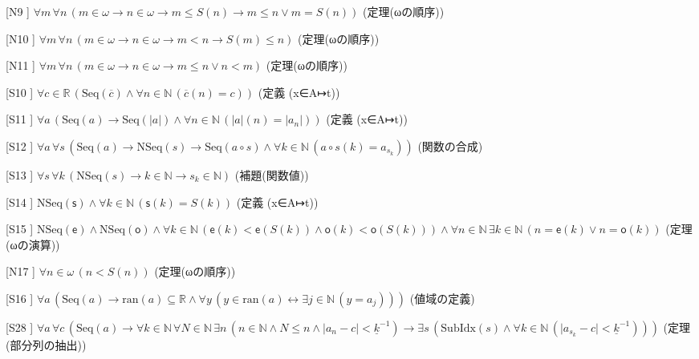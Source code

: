 \begin{registrylist}
\item[[N9]] $\forall m\,\forall n\,(m \in \omega \to n \in \omega \to m \leq S(n) \to m \leq n \lor m = S(n))$ \hfill{\footnotesize(定理(ωの順序))}
\item[[N10]] $\forall m\,\forall n\,(m \in \omega \to n \in \omega \to m < n \to S(m) \leq n)$ \hfill{\footnotesize(定理(ωの順序))}
\item[[N11]] $\forall m\,\forall n\,(m \in \omega \to n \in \omega \to m \leq n \lor n < m)$ \hfill{\footnotesize(定理(ωの順序))}
\item[[S10]] $\forall c \in \mathbb{R}\,(\mathrm{Seq}(\overline{c}) \land \forall n \in \mathbb{N}\,(\overline{c}(n) = c))$ \hfill{\footnotesize(定義 (x∈A↦t))}
\item[[S11]] $\forall a\,(\mathrm{Seq}(a) \to \mathrm{Seq}(\lvert a \rvert) \land \forall n \in \mathbb{N}\,(\lvert a \rvert(n) = \lvert a_{n} \rvert))$ \hfill{\footnotesize(定義 (x∈A↦t))}
\item[[S12]] $\forall a\,\forall s\,(\mathrm{Seq}(a) \to \mathrm{NSeq}(s) \to \mathrm{Seq}(a \circ s) \land \forall k \in \mathbb{N}\,(a \circ s(k) = a_{s_{k}}))$ \hfill{\footnotesize(関数の合成)}
\item[[S13]] $\forall s\,\forall k\,(\mathrm{NSeq}(s) \to k \in \mathbb{N} \to s_{k} \in \mathbb{N})$ \hfill{\footnotesize(補題(関数値))}
\item[[S14]] $\mathrm{NSeq}(\mathsf{s}) \land \forall k \in \mathbb{N}\,(\mathsf{s}(k) = S(k))$ \hfill{\footnotesize(定義 (x∈A↦t))}
\item[[S15]] $\mathrm{NSeq}(\mathsf{e}) \land \mathrm{NSeq}(\mathsf{o}) \land \forall k \in \mathbb{N}\,(\mathsf{e}(k) < \mathsf{e}(S(k)) \land \mathsf{o}(k) < \mathsf{o}(S(k))) \land \forall n \in \mathbb{N}\,\exists k \in \mathbb{N}\,(n = \mathsf{e}(k) \lor n = \mathsf{o}(k))$ \hfill{\footnotesize(定理(ωの演算))}
\item[[N17]] $\forall n \in \omega\,(n < S(n))$ \hfill{\footnotesize(定理(ωの順序))}
\item[[S16]] $\forall a\,(\mathrm{Seq}(a) \to \mathrm{ran}(a) \subseteq \mathbb{R} \land \forall y\,(y \in \mathrm{ran}(a) \leftrightarrow \exists j \in \mathbb{N}\,(y = a_{j})))$ \hfill{\footnotesize(値域の定義)}
\item[[S28]] $\forall a\,\forall c\,(\mathrm{Seq}(a) \to \forall k \in \mathbb{N}\,\forall N \in \mathbb{N}\,\exists n\,(n \in \mathbb{N} \land N \leq n \land \lvert a_{n} - c \rvert < \underline{k}^{-1}) \to \exists s\,(\mathrm{SubIdx}(s) \land \forall k \in \mathbb{N}\,(\lvert a_{s_{k}} - c \rvert < \underline{k}^{-1})))$ \hfill{\footnotesize(定理(部分列の抽出))}

\end{registrylist}
